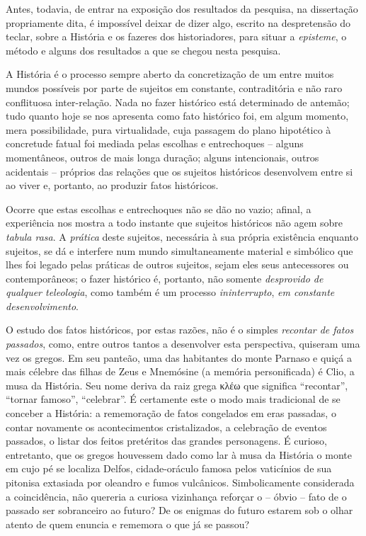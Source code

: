 Antes, todavia, de entrar na exposição dos resultados da pesquisa, na dissertação propriamente dita, é impossível deixar de dizer algo, escrito na despretensão do teclar, sobre a História e os fazeres dos historiadores, para situar a \textit{episteme}, o método e alguns dos resultados a que se chegou nesta pesquisa.

A História é o processo sempre aberto da concretização de um entre muitos mundos possíveis por parte de sujeitos em constante, contraditória e não raro conflituosa inter-relação. Nada no fazer histórico está determinado de antemão; tudo quanto hoje se nos apresenta como fato histórico foi, em algum momento, mera possibilidade, pura virtualidade, cuja passagem do plano hipotético à concretude fatual foi mediada pelas escolhas e entrechoques – alguns momentâneos, outros de mais longa duração; alguns intencionais, outros acidentais – próprios das relações que os sujeitos históricos desenvolvem entre si ao viver e, portanto, ao produzir fatos históricos.

Ocorre que estas escolhas e entrechoques não se dão no vazio; afinal, a experiência nos mostra a todo instante que sujeitos históricos não agem sobre \textit{tabula rasa}. A \textit{prática} deste sujeitos, necessária à sua própria existência enquanto sujeitos, se dá e interfere num mundo simultaneamente material e simbólico que lhes foi legado pelas práticas de outros sujeitos, sejam eles seus antecessores ou contemporâneos; o fazer histórico é, portanto, não somente \textit{desprovido de qualquer teleologia}, como também é um processo \textit{ininterrupto}, \textit{em constante desenvolvimento}.

O estudo dos fatos históricos, por estas razões, não é o simples \textit{recontar de fatos passados}, como, entre outros tantos a desenvolver esta perspectiva, quiseram uma vez os gregos. Em seu panteão, uma das habitantes do monte Parnaso e quiçá a mais célebre das filhas de Zeus e Mnemósine (a memória personificada) é Clio, a musa da História. Seu nome deriva da raiz grega \textgreek{κλέω} que significa ``recontar'', ``tornar famoso'', ``celebrar''. É certamente este o modo mais tradicional de se conceber a História: a rememoração de fatos congelados em eras passadas, o contar novamente os acontecimentos cristalizados, a celebração de eventos passados, o listar dos feitos pretéritos das grandes personagens. É curioso, entretanto, que os gregos houvessem dado como lar à musa da História o monte em cujo pé se localiza Delfos, cidade-oráculo famosa pelos vaticínios de sua pitonisa extasiada por oleandro e fumos vulcânicos. Simbolicamente considerada a coincidência, não quereria a curiosa vizinhança reforçar o – óbvio – fato de o passado ser sobranceiro ao futuro? De os enigmas do futuro estarem sob o olhar atento de quem enuncia e rememora o que já se passou?

